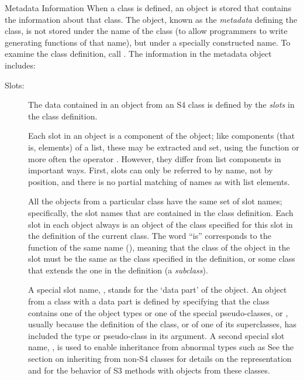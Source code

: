 \begin{Section}{Metadata Information}
When a class is defined, an object is stored that contains the
information about that class.  The object, known as the
\emph{metadata} defining the class, is not stored under the name of
the class (to allow programmers to write generating functions of
that name), but under a specially constructed name.
To examine the class definition, call .  The
information in the metadata object includes:

\begin{description}

\item[Slots:] 

The data contained in an object from an S4 class is defined by
the \emph{slots} in the class definition.

Each slot in an object is a component of the object;
like components (that is, elements) of a
list, these may be extracted and set, using the
function  or more often the operator
.  However, they
differ from list components in important ways.
First, slots can only be referred to by name, not by position,
and there is no partial matching of names as with list elements.

All the objects from a particular class have the same set of slot
names; specifically, the slot names that are contained in the
class definition.  Each slot in each object always is an object
of  the
class specified for this slot in the definition of the current class.
The word ``is'' corresponds to the \R{} function of the same
name (), meaning that the class of the object in
the slot must be the same as the class specified in the
definition, or some class that extends the one in the
definition (a \emph{subclass}).

A special slot name, , stands for the
`data part' of the object.  An object from a class with a
data part is defined by specifying that the class contains one
of the \R{} object types or one of the special pseudo-classes,
 or , usually because the definition of
the class, or of one of its superclasses, has included the type
or pseudo-class in its  argument.  A second
special slot name, , is used to enable inheritance
from abnormal types such as 
See the section on inheriting from non-S4 classes
for details on the representation and
for the behavior of S3 methods with objects from these classes.


\end{description}
\end{Section}
